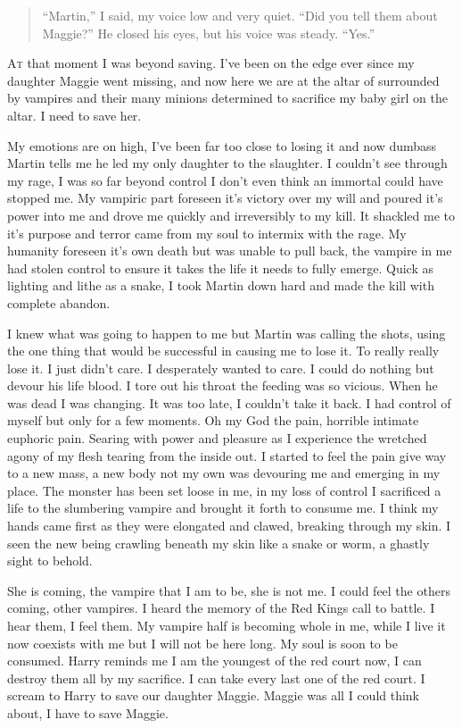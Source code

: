 
\begin{quote}
	``Martin,” I said, my voice low and very quiet. “Did you tell them about Maggie?”
	He closed his eyes, but his voice was steady. “Yes.”
\end{quote}

\lettrine[lines=2,lraise=0]{A}t that moment I was beyond saving. I've been on the edge ever since my daughter Maggie went missing, and now here we are at the altar of \chichenitza* surrounded by vampires and their many minions determined to sacrifice my baby girl on the altar. I need to save her. 

My emotions are on high, I've been far too close to losing it and now dumbass Martin tells me he led my only daughter to the slaughter. I couldn't see through my rage, I was so far beyond control I don't even think an immortal could have stopped me. My vampiric part foreseen it's victory over my will and poured it's power into me and drove me quickly and irreversibly to my kill. It shackled me to it's purpose and terror came from my soul to intermix with the rage. My humanity foreseen it's own death but was unable to pull back, the vampire in me had stolen control to ensure it takes the life it needs to fully emerge. Quick as lighting and lithe as a snake, I took Martin down hard and made the kill with complete abandon.

I knew what was going to happen to me but Martin was calling the shots, using the one thing that would be successful in causing me to lose it. To really really lose it. I just didn't care. I desperately wanted to care. I could do nothing but devour his life blood. I tore out his throat the feeding was so vicious. When he was dead I was changing. It was too late, I couldn't take it back. I had control of myself but only for a few moments. Oh my God the pain, horrible intimate euphoric pain. Searing with power and pleasure as I experience the wretched agony of my flesh tearing from the inside out. I started to feel the pain give way to a new mass, a new body not my own was devouring me and emerging in my place. The monster has been set loose in me, in my loss of control I sacrificed a life to the slumbering vampire and brought it forth to consume me. I think my hands came first as they were elongated and clawed, breaking through my skin. I seen the new being crawling beneath my skin like a snake or worm, a ghastly sight to behold.

She is coming, the vampire that I am to be, she is not me. I could feel the others coming, other vampires. I heard the memory of the Red Kings call to battle. I hear them, I feel them. My vampire half is becoming whole in me, while I live it now coexists with me but I will not be here long. My soul is soon to be consumed. Harry reminds me I am the youngest of the red court now, I can destroy them all by my sacrifice. I can take every last one of the red court. I scream to Harry to save our daughter Maggie. Maggie was all I could think about, I have to save Maggie.

